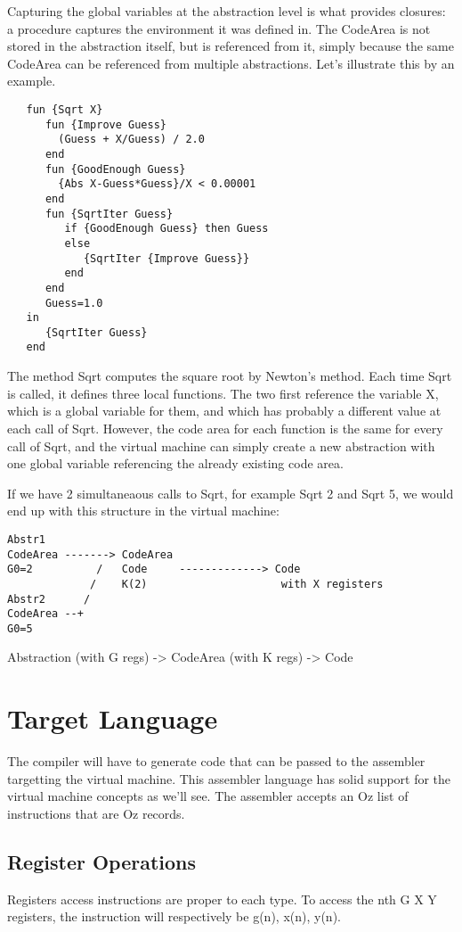 \documentclass[a4paper]{memoir}
\begin{document}
Capturing the global variables at the abstraction level is what provides
closures: a procedure captures the environment it was defined in.
The CodeArea is not stored in the abstraction itself, but is referenced from
it, simply because the same CodeArea can be referenced from multiple
abstractions. Let's illustrate this by an example. 


\begin{lstlisting}
   fun {Sqrt X}
      fun {Improve Guess}
        (Guess + X/Guess) / 2.0
      end
      fun {GoodEnough Guess}
        {Abs X-Guess*Guess}/X < 0.00001
      end
      fun {SqrtIter Guess}
         if {GoodEnough Guess} then Guess
         else
            {SqrtIter {Improve Guess}}
         end
      end
      Guess=1.0
   in
      {SqrtIter Guess}
   end
\end{lstlisting}
The method Sqrt computes the square root by Newton's method. Each time Sqrt is
called, it defines three local functions. The two first reference the variable
X, which is a global variable for them, and which has probably a different
value at each call of Sqrt. However, the code area for each function is the
same for every call of Sqrt, and the virtual machine can simply create a new
abstraction with one global variable referencing the already existing code
area. 

If we have 2 simultaneaous calls to Sqrt, for example {Sqrt 2} and {Sqrt 5}, we
would end up with this structure in the virtual machine:

\begin{verbatim}
Abstr1
CodeArea -------> CodeArea
G0=2          /   Code     -------------> Code
             /    K(2)                     with X registers
Abstr2      /
CodeArea --+
G0=5
\end{verbatim}



Abstraction (with G regs)  -> CodeArea (with K regs) -> Code
\section{Target Language}
The compiler will have to generate code that can be passed to the assembler targetting the virtual machine. This assembler language has solid support for the virtual machine concepts as we'll see.
The assembler accepts an Oz list of instructions that are Oz records. 

\subsection{Register Operations}\label{sec:opcode:registers}
Registers access instructions are proper to each type. To access the nth G X Y registers, the instruction will respectively be g(n), x(n), y(n). 
\end{document}
